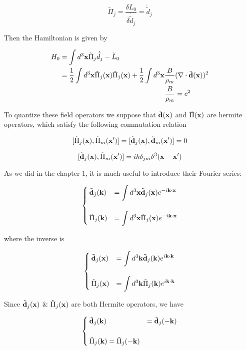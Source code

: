 ﻿\documentclass[twoside]{book}
\numberwithin{equation}{section}
\begin{document}
\[\tilde{\Pi}_j = \frac{\delta L_0}{\delta\dot{\tilde{d}}_j} = \dot{\tilde{d}}_j \]

Then the Hamiltonian is given by 

\[\begin{split}
H_0 &= \int d^3{\bf x}\tilde{\Pi}_j\dot{\tilde{d}}_j - \tilde{L}_0\\
 &=\frac{1}{2}\int d^3{\bf x}\tilde{\Pi}_j({\bf x})\tilde{\Pi}_j({\bf x}) + \frac{1}{2}\int d^3{\bf x}\frac{B}{\rho_m}(\nabla\cdot\tilde{\bf d}{\bf(x)})^2\\
 & \quad\quad\quad\quad\quad\quad\quad\quad\quad\quad\quad\quad\quad\quad\quad \frac{B}{\rho_m} = c^2
\end{split}\]

To quantize these field operators we suppose that $\tilde{\bf d}(\bf x)$ and $\tilde{\Pi}(\bf x)$ are hermite operators, which satisfy the following commutation relation

\[[\tilde{\Pi}_j({\bf x}),\tilde{\Pi}_m({\bf x'})] = [\tilde{\bf d}_j({\bf x}),\tilde{\bf d}_m({\bf x'})] = 0 \]

\[[\tilde{\bf d}_j({\bf x}), \tilde{\Pi}_m({\bf x'})] = i\hbar\delta_{jm}\delta^3(\bf x-x') \]

As we did in the chapter 1, it is much useful to introduce their Fourier series:

\[\begin{cases}
\tilde{\bf d}_j({\bf k}) &= \displaystyle\int d^3{\bf x}\tilde{\bf d}_j({\bf x}) e^{-i\bf k\cdot x}\\
\ & \\
\tilde{\Pi}_j({\bf k}) &= \displaystyle\int d^3 {\bf x} \tilde{\Pi}_j({\bf x}) e^{-i\bf k\cdot x}
\end{cases}\]

where the inverse is

\[\begin{cases}
\tilde{\bf d}_j({\bf x}) &= \displaystyle\int d^3{\bf k}\tilde{\bf d}_j({\bf k}) e^{i\bf k\cdot k}\\
\ & \\
\tilde{\Pi}_j({\bf x}) &= \displaystyle\int d^3 {\bf k} \tilde{\Pi}_j({\bf k}) e^{i\bf k\cdot k}
\end{cases}\]


Since $\tilde{\bf d}_j({\bf x})$ \& $\tilde{\Pi}_j({\bf x})$ are both Hermite operators, we have

\[\begin{cases}
\tilde{\bf d}_j({\bf k}) &= \tilde{\bf d}_j({-\bf k})\\
\ & \\
\tilde{\Pi}_j({\bf k}) = \tilde{\Pi}_j(-\bf k)
\end{cases}\]
\end{document}

